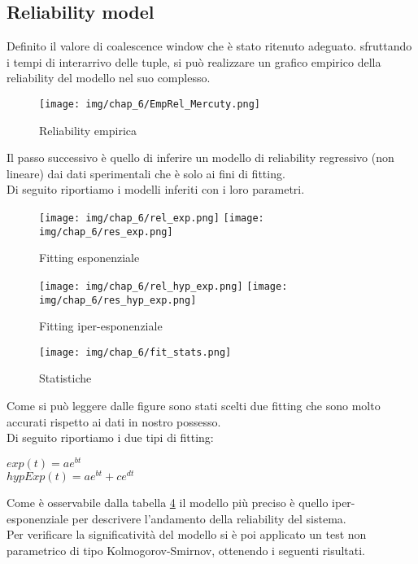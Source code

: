 \subsection{Reliability model}
Definito il valore di coalescence window che è stato ritenuto adeguato. sfruttando i tempi di interarrivo delle tuple, si può realizzare un grafico empirico della reliability del modello nel suo complesso.\\
 \begin{figure}[H]
    \centering
    \texttt{[image: img/chap\_6/EmpRel\_Mercuty.png]}
    \caption{Reliability empirica}
    \label{fig:empRel}
\end{figure}
\noindent
Il passo successivo è quello di inferire un modello di reliability regressivo (non lineare) dai dati sperimentali che è solo ai fini di fitting.\\
Di seguito riportiamo i modelli inferiti con i loro parametri.\\
 \begin{figure}[H]
    \centering
    \texttt{[image: img/chap\_6/rel\_exp.png]}
     \texttt{[image: img/chap\_6/res\_exp.png]}
    \caption{Fitting esponenziale}
    \label{fig:fitexp}
\end{figure}
 \begin{figure}[H]
    \centering
    \texttt{[image: img/chap\_6/rel\_hyp\_exp.png]}
     \texttt{[image: img/chap\_6/res\_hyp\_exp.png]}
    \caption{Fitting iper-esponenziale}
    \label{fig:fithypexp}
\end{figure}
 \begin{figure}[H]
    \centering
    \texttt{[image: img/chap\_6/fit\_stats.png]}
    \caption{Statistiche}
    \label{fig:stats}
\end{figure}
\noindent
Come si può leggere dalle figure sono stati scelti due fitting che sono molto accurati rispetto ai dati in nostro possesso.\\
Di seguito riportiamo i due tipi di fitting:
\begin{center}
$exp(t) = ae^{bt}$ \\
$hypExp(t) = ae^{bt} + ce^{dt}$
\end{center}
Come è osservabile dalla tabella \ref{fig:stats} il modello più preciso è quello iper-esponenziale per descrivere l'andamento della reliability del sistema.\\
Per verificare la significatività del modello si è poi applicato un test non parametrico di tipo Kolmogorov-Smirnov, ottenendo i seguenti risultati.\\
